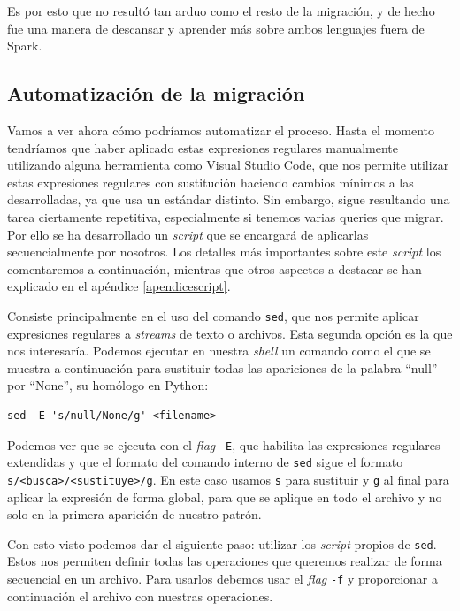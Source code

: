 \documentclass[12pt,twoside,titlepage]{report}
\newcommand{\quotes}[1]{``#1''}
\begin{document}
Es por esto que no resultó tan arduo como el resto de la migración, y de hecho fue una manera de descansar y aprender más sobre ambos lenguajes fuera de Spark.

\subsection{Automatización de la migración}

Vamos a ver ahora cómo podríamos automatizar el proceso. Hasta el momento tendríamos que haber aplicado estas expresiones regulares manualmente utilizando alguna herramienta como Visual Studio Code, que nos permite utilizar estas expresiones regulares con sustitución haciendo cambios mínimos a las desarrolladas, ya que usa un estándar distinto. Sin embargo, sigue resultando una tarea ciertamente repetitiva, especialmente si tenemos varias queries que migrar. Por ello se ha desarrollado un \textit{script} que se encargará de aplicarlas secuencialmente por nosotros. Los detalles más importantes sobre este \textit{script} los comentaremos a continuación, mientras que otros aspectos a destacar se han explicado en el apéndice \ref{apendicescript}.

Consiste principalmente en el uso del comando \texttt{sed}, que nos permite aplicar expresiones regulares a \textit{streams} de texto o archivos. Esta segunda opción es la que nos interesaría. Podemos ejecutar en nuestra \textit{shell} un comando como el que se muestra a continuación para sustituir todas las apariciones de la palabra \quotes{null} por \quotes{None}, su homólogo en Python:

\begin{lstlisting}
sed -E 's/null/None/g' <filename>
\end{lstlisting}

Podemos ver que se ejecuta con el \textit{flag} \texttt{-E}, que habilita las expresiones regulares extendidas y que el formato del comando interno de \texttt{sed} sigue el formato \texttt{s/<busca>/<sustituye>/g}. En este caso usamos \texttt{s} para sustituir y \texttt{g} al final para aplicar la expresión de forma global, para que se aplique en todo el archivo y no solo en la primera aparición de nuestro patrón.

Con esto visto podemos dar el siguiente paso: utilizar los \textit{script} propios de \texttt{sed}. Estos nos permiten definir todas las operaciones que queremos realizar de forma secuencial en un archivo. Para usarlos debemos usar el \textit{flag} \texttt{-f} y proporcionar a continuación el archivo con nuestras operaciones.
\end{document}
